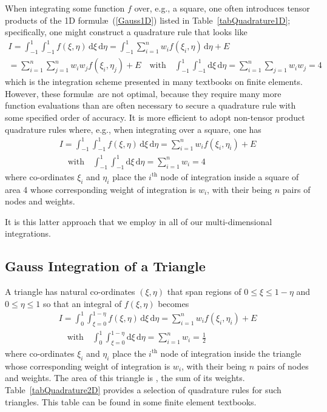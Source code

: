 When integrating some function $f$ over, e.g., a square, one often introduces tensor products of the 1D formul\ae\ (\ref{Gauss1D}) listed in Table~\ref{tabQuadrature1D}; specifically, one might construct a quadrature rule that looks like
\begin{multline*}
    I = \int_{-1}^1 \int_{-1}^1 f ( \xi , \eta ) \, \mathrm{d} \xi \, \mathrm{d} \eta =
    \int_{-1}^1 \sum_{i=1}^n w_i f ( \xi_i , \eta ) \, \mathrm{d} \eta + E \\ =
    \sum_{i=1}^n \sum_{j=1}^n w_i w_j f ( \xi_i , \eta_ j ) + E  
    \quad \text{with} \quad
    \int_{-1}^1 \int_{-1}^1 \mathrm{d} \xi \, \mathrm{d} \eta = 
    \sum_{i=1}^n \sum_{j=1} w_i w_j = 4
\end{multline*}
which is the integration scheme presented in many textbooks on finite elements.  However, these formul\ae\ are not optimal, because they require many more function evaluations than are often necessary to secure a quadrature rule with some specified order of accuracy.  It is more efficient to adopt non-tensor product quadrature rules where, e.g., when integrating over a square, one has
\begin{multline*}
    I = \int_{-1}^1 \int_{-1}^1 f ( \xi , \eta ) \, \mathrm{d} \xi \, \mathrm{d} \eta =
    \sum_{i=1}^n w_i f ( \xi_i , \eta_i ) + E  \\ 
    \quad \text{with} \quad
    \int_{-1}^1 \int_{-1}^1 \mathrm{d} \xi \, \mathrm{d} \eta = 
    \sum_{i=1}^n w_i = 4
\end{multline*}
where co-ordinates $\xi_i$ and $\eta_i$ place the $i^{\text{th}}$ node of integration inside a square of area 4 whose corresponding weight of integration is $w_i$, with their being $n$ pairs of nodes and weights.  

It is this latter approach that we employ in all of our multi-dimensional integrations.

\subsection{Gauss Integration of a Triangle}

A triangle has natural co-ordinates $( \xi , \eta )$ that span regions of $0 \leq \xi \leq 1-\eta$ and $0 \leq \eta \leq 1$ so that an integral of $f(\xi, \eta)$ becomes
\begin{multline}
I = \int_0^1 \int_{\xi =0}^{1-\eta} f ( \xi , \eta ) \, \mathrm{d} \xi \, \mathrm{d} \eta =
\sum_{i=1}^n w_i f ( \xi_i , \eta_i ) + E \\
\quad \text{with} \quad
\int_0^1 \int_{\xi =0}^{1-\eta} \mathrm{d} \xi \, \mathrm{d} \eta = 
\sum_{i=1}^n w_i = \frac{1}{2}
\label{GaussTriangle}
\end{multline}
where co-ordinates $\xi_i$ and $\eta_i$ place the $i^{\text{th}}$ node of integration inside the triangle whose corresponding weight of integration is $w_i$, with their being $n$ pairs of nodes and weights.  The area of this triangle is , the sum of its weights. Table~\ref{tabQuadrature2D} provides a selection of quadrature rules for such triangles.  This table can be found in some finite element textbooks.

